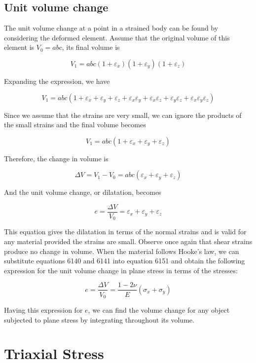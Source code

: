 \documentclass[
10pt,
a4paper,
openany,
svgnames,
]{book} %
\begin{document}
\subsection{Unit volume change}

The unit volume change at a point in a strained body can be found by considering the deformed element. Assume that the original volume of this element is $V_0 = abc$, its final volume is

\[V_1 = abc(1 + \varepsilon_x)(1 + \varepsilon_y)(1 + \varepsilon_z)\]

Expanding the expression, we have

\[V_1 = abc(1 + \varepsilon _x + \varepsilon _y + \varepsilon _z + \varepsilon_x\varepsilon_y + \varepsilon_x\varepsilon_z + \varepsilon_y\varepsilon_z + \varepsilon_x\varepsilon_y\varepsilon_z)\]

Since we assume that the strains are very small, we can ignore the products of the small strains and the final volume becomes

\[V_1 = abc(1 + \varepsilon_x + \varepsilon_y + \varepsilon_z)\]

Therefore, the change in volume is

\[\Delta V = V_1 - V_0 = abc(\varepsilon_x + \varepsilon_y + \varepsilon_z)\]

And the unit volume change, or dilatation, becomes

\begin{equation} \label{eqn: 2d dilatation}
  e = \frac{\Delta V}{V_0} = \varepsilon_x + \varepsilon_y + \varepsilon_z
\end{equation}

This equation gives the dilatation in terms of the normal strains and is valid for any material provided the strains are small. Observe once again that shear strains produce no change in volume. When the material follows Hooke’s law, we can substitute equations 6140 and 6141 into equation 6151 and obtain the following expression for the unit volume change in plane stress in terms of the stresses:

\begin{equation}
  e = \frac{\Delta V}{V_0} = \frac{1 - 2\nu}{E}(\sigma_x + \sigma_y)
\end{equation}
  
Having this expression for $e$, we can find the volume change for any object subjected to plane stress by integrating throughout its volume.

\section{Triaxial Stress}
\end{document}
